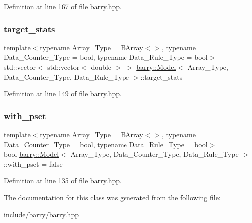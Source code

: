Definition at line 167 of file barry.\+hpp.

\mbox{\label{classbarry_1_1_model_ab2a0fde37b6a6da5a5faffcd24ec4c27}} 
\subsubsection{\texorpdfstring{target\+\_\+stats}{target\_stats}}
{\footnotesize\ttfamily template$<$typename Array\+\_\+\+Type  = B\+Array$<$$>$, typename Data\+\_\+\+Counter\+\_\+\+Type  = bool, typename Data\+\_\+\+Rule\+\_\+\+Type  = bool$>$ \\
std\+::vector$<$ std\+::vector$<$ double $>$ $>$ \hyperlink{classbarry_1_1_model}{barry\+::\+Model}$<$ Array\+\_\+\+Type, Data\+\_\+\+Counter\+\_\+\+Type, Data\+\_\+\+Rule\+\_\+\+Type $>$\+::target\+\_\+stats}



Definition at line 149 of file barry.\+hpp.

\mbox{\label{classbarry_1_1_model_a08c74ccd0aa76906f724ccb5e36d0762}} 
\subsubsection{\texorpdfstring{with\+\_\+pset}{with\_pset}}
{\footnotesize\ttfamily template$<$typename Array\+\_\+\+Type  = B\+Array$<$$>$, typename Data\+\_\+\+Counter\+\_\+\+Type  = bool, typename Data\+\_\+\+Rule\+\_\+\+Type  = bool$>$ \\
bool \hyperlink{classbarry_1_1_model}{barry\+::\+Model}$<$ Array\+\_\+\+Type, Data\+\_\+\+Counter\+\_\+\+Type, Data\+\_\+\+Rule\+\_\+\+Type $>$\+::with\+\_\+pset = false}



Definition at line 135 of file barry.\+hpp.



The documentation for this class was generated from the following file\+:\begin{DoxyCompactItemize}
\item 
include/barry/\hyperlink{barry_8hpp}{barry.\+hpp}\end{DoxyCompactItemize}
